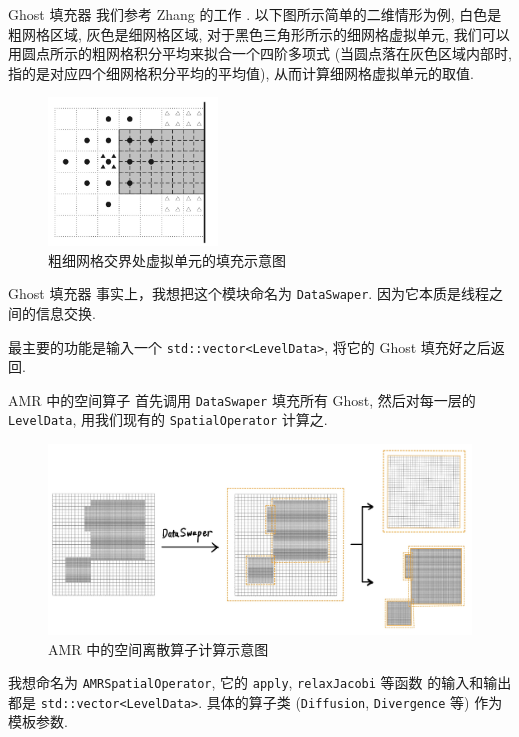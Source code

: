 \documentclass[10pt]{beamer}
\begin{document}
\begin{frame}[fragile]{Ghost 填充器}
    \footnotesize
    我们参考 Zhang 的工作 .
    以下图所示简单的二维情形为例, 白色是粗网格区域,
    灰色是细网格区域, 对于黑色三角形所示的细网格虚拟单元,
    我们可以用圆点所示的粗网格积分平均来拟合一个四阶多项式
    (当圆点落在灰色区域内部时, 指的是对应四个细网格积分平均的平均值),
    从而计算细网格虚拟单元的取值.
    
    \begin{figure}[H]
        \centering
        \includegraphics[width=0.4\textwidth]{jpg/fillGhost.jpeg}
        \caption{粗细网格交界处虚拟单元的填充示意图}
    \end{figure}
\end{frame}

\begin{frame}[fragile]{Ghost 填充器}
    \footnotesize
    事实上，我想把这个模块命名为 \verb|DataSwaper|.
    因为它本质是线程之间的信息交换.

    \vspace{1em}
    最主要的功能是输入一个 \verb|std::vector<LevelData>|,
    将它的 Ghost 填充好之后返回.
\end{frame}

\begin{frame}[fragile]{AMR 中的空间算子}
    \footnotesize
    首先调用 \verb|DataSwaper| 填充所有 Ghost,
    然后对每一层的 \verb|LevelData|,
    用我们现有的 \verb|SpatialOperator| 计算之.

    \begin{figure}[H]
        \centering
        \includegraphics[width=\textwidth]{jpg/DiscOp.jpeg}
        \caption{AMR 中的空间离散算子计算示意图}
    \end{figure}

    \pause
    我想命名为 \verb|AMRSpatialOperator|,
    它的 \verb|apply|, \verb|relaxJacobi| 等函数
    的输入和输出都是 \verb|std::vector<LevelData>|.
    具体的算子类 (\verb|Diffusion|, \verb|Divergence| 等) 作为模板参数.
\end{frame}
\end{document}
